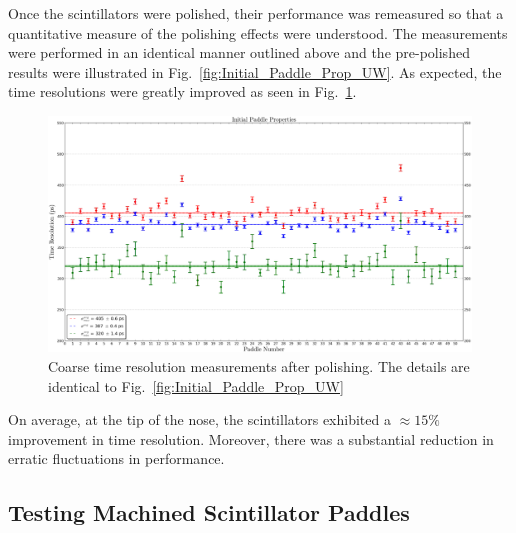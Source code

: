 Once the scintillators were polished, their performance was remeasured so that a quantitative measure of the polishing effects were understood.  The measurements were performed in an identical manner outlined above and the pre-polished results were illustrated in Fig.~\ref{fig:Initial_Paddle_Prop_UW}. As expected, the time resolutions were greatly improved as seen in Fig.~\ref{fig:Polished_Paddle_Prop_UW}.
\begin{figure}[!htb]
	\centering
	\includegraphics[width=1.0\columnwidth]{fabrication/figs/Polished_Paddle_Prop_UW}
	\caption[Coarse time resolution measurements after polishing]{Coarse time resolution measurements after polishing. The details are identical to Fig.~\ref{fig:Initial_Paddle_Prop_UW}}
	\label{fig:Polished_Paddle_Prop_UW}
\end{figure}
On average, at the tip of the nose, the scintillators exhibited a $\approx15\%$ improvement in time resolution.  Moreover, there was a substantial reduction in erratic fluctuations in performance.

\subsection{Testing Machined Scintillator Paddles} \label{sec:fab_test}

